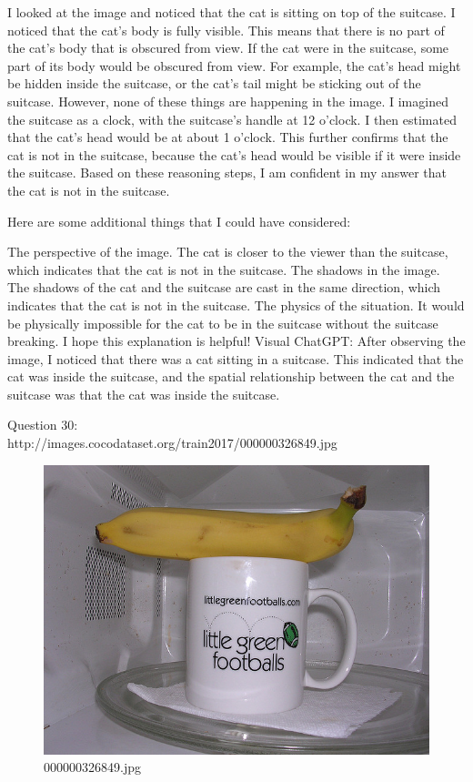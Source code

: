 \begin{enumerate}
        I looked at the image and noticed that the cat is sitting on top of the suitcase.
        I noticed that the cat's body is fully visible. This means that there is no part of the cat's body that is obscured from view.
        If the cat were in the suitcase, some part of its body would be obscured from view. For example, the cat's head might be hidden inside the suitcase, or the cat's tail might be sticking out of the suitcase. However, none of these things are happening in the image.
        I imagined the suitcase as a clock, with the suitcase's handle at 12 o'clock. I then estimated that the cat's head would be at about 1 o'clock. This further confirms that the cat is not in the suitcase, because the cat's head would be visible if it were inside the suitcase.
        Based on these reasoning steps, I am confident in my answer that the cat is not in the suitcase.
        
        Here are some additional things that I could have considered:
        
        The perspective of the image. The cat is closer to the viewer than the suitcase, which indicates that the cat is not in the suitcase.
        The shadows in the image. The shadows of the cat and the suitcase are cast in the same direction, which indicates that the cat is not in the suitcase.
        The physics of the situation. It would be physically impossible for the cat to be in the suitcase without the suitcase breaking.
        I hope this explanation is helpful!
        \subitem Visual ChatGPT: After observing the image, I noticed that there was a cat sitting in a suitcase. This indicated that the cat was inside the suitcase, and the spatial relationship between the cat and the suitcase was that the cat was inside the suitcase.
    \end{enumerate}
    Question 30:\\http://images.cocodataset.org/train2017/000000326849.jpg
    \begin{figure}[h]
        \centering
        \includegraphics[width=0.8\linewidth]{../image set/easy/000000326849.jpg}
        \caption{000000326849.jpg}
    \end{figure}
